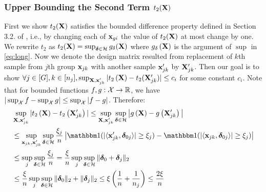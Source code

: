 \subsubsection{Upper Bounding the Second Term $t_2(\mathbf{X})$}
First we show $t_2(\mathbf{X})$ satisfies the bounded difference property defined in Section 3.2. of \cite{boucheron13}, i.e., by changing each of $\mathbf{x}_{gi}$ the value of $t_2(\mathbf{X})$ at most change by one. 
We rewrite $t_2$ as $t_2(\X) = \sup_{\ddelta \in \cH} g_\delta(\X)$ where $g_\delta\left(\mathbf{X} \right)$ is the argument of $\sup$ in \eqref{eq:long}.
Now we denote the design matrix resulted from replacement of $k$th sample from $j$th group $\mathbf{x}_{jk}$ with another sample $\mathbf{x}'_{jk}$ by $\mathbf{X}'_{jk}$. Then our goal is to show $\forall j \in [G], k \in [n_j], \sup_{\mathbf{X}, \mathbf{x}_{jk}'} |t_2\left(\mathbf{X} \right)  - t_2(\mathbf{X}'_{jk} )|  \leq c_i$ for some constant $c_i$. 
Note that for bounded functions $f, g: \cX \rightarrow \reals$, we have $|\sup_{\cX} f - \sup_{\cX} g| \leq \sup_{\cX} |f - g|$. 
Therefore:
\begin{align}
\nr 
&\sup_{\X, \x_{jk}'} |t_2\left(\X \right)  - t_2\left(\X'_{jk} \right)|
\leq \sup_{\X, \x_{jk}'} \sup_{\ddelta \in \cH} \big|g\left(\X \right) - g\left(\X'_{jk} \right) \big|
\\ \nr 
&\leq \sup_{\x_{jk},  \x_{jk}'} \sup_{\ddelta \in \cH} \frac{\xi_j}{n} \left|\indic (|\langle \x_{jk}', \ddelta_{0j}\rangle| \geq   \xi_j)  - \indic (|\langle \x_{jk}, \ddelta_{0j} \rangle| \geq   \xi_j) \right| 
\\ \nr 
&\leq \sup_{j} \sup_{\ddelta \in \cH} \frac{\xi_j}{n} 
= \frac{\xi}{n} \sup_{j} \sup_{\ddelta \in \cH} {\norm{\ddelta_0 + \ddelta_j}{2}}
\\ \nr 
&\leq \frac{\xi}{n} \sup_{j} \sup_{\ddelta \in \cH} \norm{\ddelta_0}{2} + \norm{\ddelta_j}{2}
\leq \xi \left(\frac{1}{n} + \frac{1}{{n_j}}\right) 
\leq  \frac{2\xi}{n}
\end{align}
 
